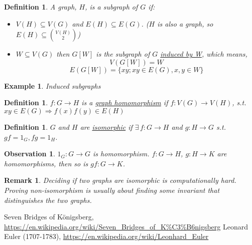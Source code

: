 \documentclass[a4paper]{article}
\theoremstyle{plain}
\newtheorem{definition}[lemma]{Definition}
\newtheorem{observation}[lemma]{Observation}
\theoremstyle{myremark}
\newtheorem{remark}[lemma]{Remark}
\newtheorem{example}[lemma]{Example}
\begin{document}
\begin{definition}
A graph, $H$, is a subgraph of $G$ if:
\begin{itemize}
    \item $V(H)\subseteq{V(G)}$ and $E(H)\subseteq{E(G)}$. ($H$ is also a graph, so $E(H)\subseteq {{V(H) \choose 2}}$)
    \item $W \subseteq V(G)$ then \underline{$G[W]$} is the subgraph of $G$ \underline{induced by W}, which means, $$V(G[W])=W$$ $$E(G[W])=\{xy; xy\in E(G), x,y\in W\}$$

\end{itemize}
\end{definition}

\begin{example}
Induced subgraphs
\end{example}

\begin{definition}
$f:G\rightarrow H$ is a \underline{graph homomorphism} if $f:V(G)\rightarrow V(H)$, \newline s.t. $xy\in E(G)\Rightarrow f(x)f(y)\in E(H)$
\end{definition}

\begin{definition}
$G$ and $H$ are \underline{isomorphic} if $\exists\,f:G\rightarrow H$ and $g:H\rightarrow G$ s.t. $gf=1_G, fg=1_H$.
\end{definition}

\begin{observation}
$1_G:G\rightarrow G$ is homomorphism. $f:G\rightarrow H$, $g:H\rightarrow K$ are homomorphisms, then so is $gf:G\rightarrow K$.
\end{observation}

\begin{remark}
Deciding if two graphs are isomorphic is computationally hard. Proving non-isomorphism is usually about finding some invariant that distinguishes the two graphs.
\end{remark}

\begin{thebibliography}{9}
 Seven Bridges of K\"onigsberg, \url{https://en.wikipedia.org/wiki/Seven_Bridges_of_K%C3%B6nigsberg}
 Leonard Euler (1707-1783), \url{https://en.wikipedia.org/wiki/Leonhard_Euler}

\end{thebibliography}
\end{document}
